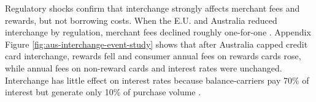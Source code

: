 \documentclass[main.tex]{subfiles}
\begin{document}
Regulatory shocks confirm that interchange strongly affects merchant fees and rewards, but not borrowing costs.
When the E.U. and Australia reduced interchange by regulation, merchant fees declined roughly one-for-one \parencite{Gans2007, Valverde.etal2016, EuropeanCommission2020}.
Appendix Figure \ref{fig:aus-interchange-event-study} shows that after Australia capped credit card interchange, rewards fell and consumer annual fees on rewards cards rose, while annual fees on non-reward cards and interest rates were unchanged.
Interchange has little effect on interest rates because balance-carriers pay 70\% of interest but generate only 10\% of purchase volume \parencite{Adams.etal2022a}.

\end{document}
